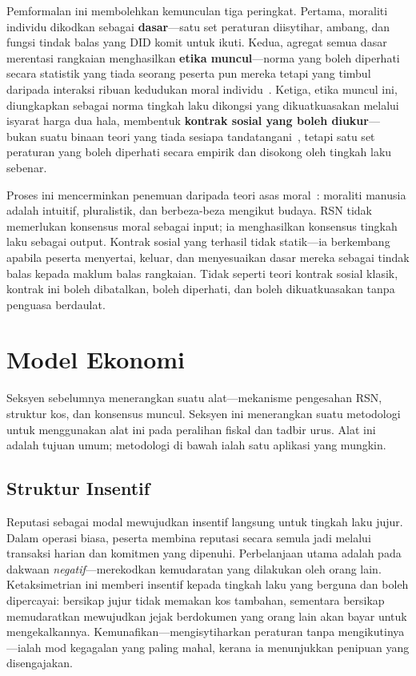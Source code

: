\documentclass[11pt,a4paper,twocolumn]{article}
\begin{document}
Pemformalan ini membolehkan kemunculan tiga peringkat. Pertama, moraliti individu dikodkan sebagai \textbf{dasar}---satu set peraturan diisytihar, ambang, dan fungsi tindak balas yang DID komit untuk ikuti. Kedua, agregat semua dasar merentasi rangkaian menghasilkan \textbf{etika muncul}---norma yang boleh diperhati secara statistik yang tiada seorang peserta pun mereka tetapi yang timbul daripada interaksi ribuan kedudukan moral individu~\cite{durkheim1893}. Ketiga, etika muncul ini, diungkapkan sebagai norma tingkah laku dikongsi yang dikuatkuasakan melalui isyarat harga dua hala, membentuk \textbf{kontrak sosial yang boleh diukur}---bukan suatu binaan teori yang tiada sesiapa tandatangani~\cite{rawls1971}, tetapi satu set peraturan yang boleh diperhati secara empirik dan disokong oleh tingkah laku sebenar.

Proses ini mencerminkan penemuan daripada teori asas moral~\cite{haidt2012}: moraliti manusia adalah intuitif, pluralistik, dan berbeza-beza mengikut budaya. RSN tidak memerlukan konsensus moral sebagai input; ia menghasilkan konsensus tingkah laku sebagai output. Kontrak sosial yang terhasil tidak statik---ia berkembang apabila peserta menyertai, keluar, dan menyesuaikan dasar mereka sebagai tindak balas kepada maklum balas rangkaian. Tidak seperti teori kontrak sosial klasik, kontrak ini boleh dibatalkan, boleh diperhati, dan boleh dikuatkuasakan tanpa penguasa berdaulat.

\section{Model Ekonomi}

Seksyen sebelumnya menerangkan suatu alat---mekanisme pengesahan RSN, struktur kos, dan konsensus muncul. Seksyen ini menerangkan suatu metodologi untuk menggunakan alat ini pada peralihan fiskal dan tadbir urus. Alat ini adalah tujuan umum; metodologi di bawah ialah satu aplikasi yang mungkin.

\subsection{Struktur Insentif}

Reputasi sebagai modal mewujudkan insentif langsung untuk tingkah laku jujur. Dalam operasi biasa, peserta membina reputasi secara semula jadi melalui transaksi harian dan komitmen yang dipenuhi. Perbelanjaan utama adalah pada dakwaan \emph{negatif}---merekodkan kemudaratan yang dilakukan oleh orang lain. Ketaksimetrian ini memberi insentif kepada tingkah laku yang berguna dan boleh dipercayai: bersikap jujur tidak memakan kos tambahan, sementara bersikap memudaratkan mewujudkan jejak berdokumen yang orang lain akan bayar untuk mengekalkannya. Kemunafikan---mengisytiharkan peraturan tanpa mengikutinya---ialah mod kegagalan yang paling mahal, kerana ia menunjukkan penipuan yang disengajakan.
\end{document}
